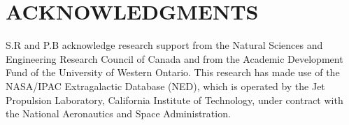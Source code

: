 \documentclass[useAMS,usenatbib]{mn2e}
\begin{document}
\section*{ACKNOWLEDGMENTS}
S.R and P.B acknowledge research support from the Natural Sciences and Engineering Research Council of Canada and from the Academic Development Fund of the University of Western Ontario. This research has made use of the NASA/IPAC Extragalactic Database (NED), which is operated by the Jet Propulsion Laboratory, California Institute of Technology, under contract with the National Aeronautics and Space Administration.


\end{document}
